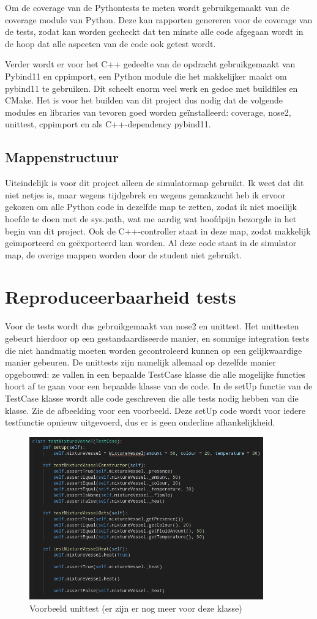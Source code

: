 \documentclass{article}
\begin{document}
    Om de coverage van de Pythontests te meten wordt gebruikgemaakt van de coverage module van Python. Deze kan rapporten genereren voor de coverage van de tests, zodat kan worden gecheckt dat ten minste alle code afgegaan wordt in de hoop dat alle aspecten van de code ook getest wordt.
    
    Verder wordt er voor het C++ gedeelte van de opdracht gebruikgemaakt van Pybind11 en cppimport, een Python module die het makkelijker maakt om pybind11 te gebruiken. Dit scheelt enorm veel werk en gedoe met buildfiles en CMake. Het is voor het builden van dit project dus nodig dat de volgende modules en libraries van tevoren goed worden ge\"installeerd: coverage, nose2, unittest, cppimport en als C++-dependency pybind11.
    
    \subsection{Mappenstructuur}
    Uiteindelijk is voor dit project alleen de simulatormap gebruikt. Ik weet dat dit niet netjes is, maar wegens tijdgebrek en wegens gemakzucht heb ik ervoor gekozen om alle Python code in dezelfde map te zetten, zodat ik niet moeilijk hoefde te doen met de sys.path, wat me aardig wat hoofdpijn bezorgde in het begin van dit project. Ook de C++-controller staat in deze map, zodat makkelijk ge\"importeerd en ge\"exporteerd kan worden. Al deze code staat in de simulator map, de overige mappen worden door de student niet gebruikt.
    
    \section{Reproduceerbaarheid tests}
    Voor de tests wordt dus gebruikgemaakt van nose2 en unittest. Het unittesten gebeurt hierdoor op een gestandaardiseerde manier, en sommige integration tests die niet handmatig moeten worden gecontroleerd kunnen op een gelijkwaardige manier gebeuren. De unittests zijn namelijk allemaal op dezelfde manier opgebouwd: ze vallen in een bepaalde TestCase klasse die alle mogelijke functies hoort af te gaan voor een bepaalde klasse van de code. In de setUp functie van de TestCase klasse wordt alle code geschreven die alle tests nodig hebben van die klasse. Zie de afbeelding voor een voorbeeld. Deze setUp code wordt voor iedere testfunctie opnieuw uitgevoerd, dus er is geen onderline afhankelijkheid.
    
    \begin{figure}[H]
    	\centering
    	\includegraphics[width=0.9\textwidth]{figures/setup.png}
    	\caption{Voorbeeld unittest (er zijn er nog meer voor deze klasse)}
    \end{figure}
    
\end{document}
